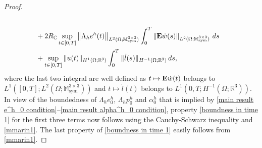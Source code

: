 \documentclass[reqno,10pt]{amsart}
\numberwithin{equation}{section}
\theoremstyle{remark}
\newcommand{\C}{\mathbb{C}}
\newcommand{\M}{\mathbb{M}}
\newcommand{\R}{\mathbb{R}}
\DeclareMathOperator{\sym}{sym}
\newcommand{\E}{{\bf E}}
\begin{document}
\begin{proof}
\begin{align*}
	\\& + 2 R_{\C} \sup_{t \in [0, T]} \left\|\Lambda_h e^h(t)\right\|_{L^2(\Omega;\M^{3 \times 3}_{\sym})} \int_0^T \left\|{\E}\dot{w}(s)\right\|_{L^2(\Omega;\M^{3 \times 3}_{\sym})} \,ds\\ &+\sup_{t \in [0,T]}\|u(t) \|_{H^{1}(\Omega;\R^3)}\int_0^T \|\dot{l}(s)\|_{H^{-1}(\Omega;\R^3)} \,ds,
\end{align*} 
where the last two integral are well defined as $t \mapsto {\E}\dot{w}(t)$ belongs to $L^1([0, T];L^2(\Omega;\M^{3 \times 3}_{\sym}))$ and $t \mapsto \dot{l}(t)$ belongs to $L^1(0,T;H^{-1}(\Omega;\R^3))$.
In view of the boundedness of $\Lambda_h e^h_0$, $\Lambda_h p^h_0$ and $\alpha^h_0$ that is implied by \eqref{main result e^h_0 condition}--\eqref{main result alpha^h_0 condition}, property \eqref{boundness in time 1} for the first three terms now follows using the Cauchy-Schwarz inequality and \eqref{mmarin1}. The last property of \eqref{boundness in time 1} easily follows from \eqref{mmarin1}.


\end{proof}
\end{document}
